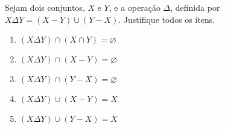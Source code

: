 \item
Sejam dois conjuntos, $X$ e $Y$, e a operação $\Delta$, definida por
$X \Delta Y = (X - Y) \cup (Y -X)$.
Justifique todos os ítens.
\begin{enumerate}
\item $(X \Delta Y) \cap (X \cap Y) = \varnothing$
\item $(X \Delta Y) \cap (X - Y) = \varnothing$
\item $(X \Delta Y) \cap (Y - X) = \varnothing$
\item $(X \Delta Y) \cup (X - Y) = X$
\item $(X \Delta Y) \cup (Y - X) = X$
\end{enumerate}
